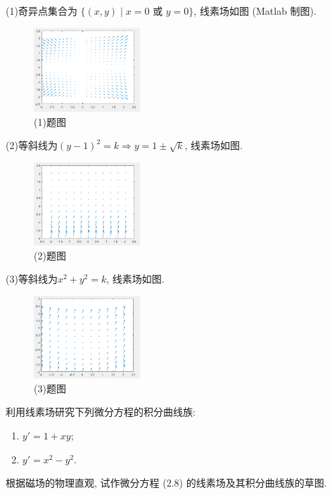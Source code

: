 \begin{solution}
  (1)奇异点集合为 $\{(x,y)\mid x=0\text{\ 或\ }y=0\}$, 线素场如图 (Matlab 制图).
  \begin{figure}[htb]
  \centering
  \includegraphics[width=4cm]{figure/ODE1_2_1.png}
  \caption{(1)题图}
  \end{figure}

  (2)等斜线为$(y-1)^2=k\Rightarrow y=1\pm\sqrt{k}$, 线素场如图.
  \begin{figure}[htb]
  \centering
  \includegraphics[width=4cm]{figure/ODE1_2_2.png}
  \caption{(2)题图}
  \end{figure}

  (3)等斜线为$x^2+y^2=k$, 线素场如图.
  \begin{figure}[htb]
  \centering
  \includegraphics[width=4cm]{figure/ODE1_2_3.png}
  \caption{(3)题图}
  \end{figure}
\end{solution}



\begin{exercise}
  利用线素场研究下列微分方程的积分曲线族:
  \begin{enumerate}[(1)]
    \item $y' = 1+xy$;
    \item $y' = x^2-y^2$.
  \end{enumerate}
\end{exercise}



\begin{exercise}
  根据磁场的物理直观, 试作微分方程 (2.8) 的线素场及其积分曲线族的草图.
\end{exercise}